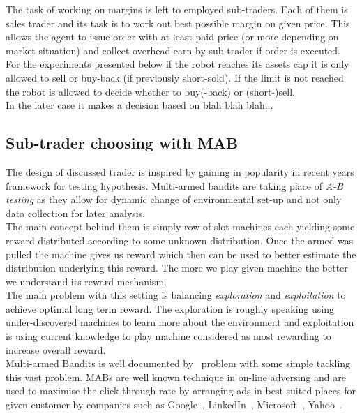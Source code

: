 \documentclass{llncs}
\begin{document}
The task of working on margins is left to employed sub-traders. Each of them is sales trader and its task is to work out best possible margin on given price. This allows the agent to issue order with at least paid price (or more depending on market situation) and collect overhead earn by sub-trader if order is executed.\\
For the experiments presented below if the robot reaches its assets cap it is only allowed to sell or buy-back (if previously short-sold). If the limit is not reached the robot is allowed to decide whether to buy(-back) or (short-)sell.\\
In the later case it makes a decision based on blah blah blah...

\subsection{Sub-trader choosing with MAB}
The design of discussed trader is inspired by gaining in popularity in recent years framework for testing hypothesis. Multi-armed bandits are taking place of \emph{A-B testing} as they allow for dynamic change of environmental set-up and not only data collection for later analysis.\\
The main concept behind them is simply row of slot machines each yielding some reward distributed according to some unknown distribution. Once the armed was pulled the machine gives us reward which then can be used to better estimate the distribution underlying this reward. The more we play given machine the better we understand its reward mechanism.\\
The main problem with this setting is balancing \emph{exploration} and \emph{exploitation} to achieve optimal long term reward. The exploration is roughly speaking using under-discovered machines to learn more about the environment and exploitation is using current knowledge to play machine considered as most rewarding to increase overall reward.\\
Multi-armed Bandits is well documented by~\cite{berry+firstedt, gittins+glazebrook+weber} problem with some simple tackling this vast problem. MABs are well known technique in on-line adversing and are used to maximise the click-through rate by arranging ads in best suited places for given customer by companies such as Google~\cite{AYPSze12, ASMB:ASMB874}, LinkedIn~\cite{Tang:2013:AAF:2505515.2514700}, Microsoft~\cite{graepel2010web}, Yahoo~\cite{Li:2010:CAP:1772690.1772758}.\\
\end{document}
